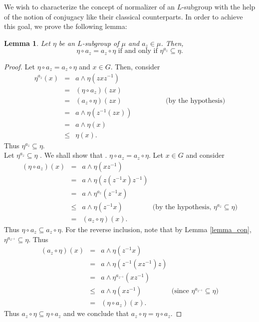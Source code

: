 \documentclass[10pt]{article}
\theoremstyle{plain}
\newtheorem{lemma}[theorem]{Lemma}
\theoremstyle{definition}
\theoremstyle{remark}
\theoremstyle{case}
\begin{document}
\noindent We wish to characterize the concept of normalizer of an $L$-subgroup with the help of the notion of conjugacy like their classical counterparts. In order to achieve this goal, we prove the following lemma:
\begin{lemma}
	Let $\eta$ be an $L$-subgroup of $\mu$ and $a_z \in \mu$. Then,
	\[
	\eta \circ a_z = a_z \circ \eta \text{~if and only if~} \eta^{a_z} \subseteq \eta.
	\]
\end{lemma}
\begin{proof}
	Let $\eta \circ a_z = a_z \circ \eta$ and $x\in G$. Then, consider
	\begin{eqnarray*}
		\eta^{a_z}(x) &=& a \wedge \eta (zxz^{-1})\\
		&=& (\eta \circ a_z)(zx)\\
		&=& (a_z \circ \eta)(zx)~\qquad\qquad\qquad \text{(by the hypothesis)}\\
		&=& a \wedge \eta (z^{-1}(zx))\\
		&=&a \wedge \eta(x)\\
		&\leq& \eta(x).
	\end{eqnarray*}
	Thus $\eta^{a_z} \subseteq \eta$. \\
	 Let $\eta^{a_z} \subseteq \eta$ . We shall show that . $\eta \circ {a_z} = a_z \circ \eta$. Let $x\in G$ and consider
	\begin{eqnarray*}
		(\eta \circ {a_z})(x) &=& a \wedge \eta (xz^{-1})\\
		&=& a \wedge \eta (z (z^{-1}x)z^{-1})\\
		&=& a \wedge \eta^{a_z}(z^{-1}x)\\
		&\leq& a \wedge \eta(z^{-1}x) \qquad\qquad ~\text{(by the hypothesis,~$\eta^{a_z} \subseteq \eta$)}\\
		&=& (a_z \circ \eta)(x).
	\end{eqnarray*}
	Thus $\eta \circ a_z \subseteq   a_z\circ \eta$. For the reverse inclusion, note that by Lemma \ref{lemma_con}, $\eta^{a_{z^{-1}}} \subseteq \eta$. Thus
	\begin{eqnarray*}
		(a_z \circ \eta)(x) &=& a \wedge \eta (z^{-1}x)\\
		&=& a \wedge \eta (z^{-1} (xz^{-1})z)\\
		&=& a \wedge \eta^{a_{z^{-1}}}(xz^{-1})\\
		&\leq& a \wedge \eta(xz^{-1}) \qquad\qquad ~\text{(since $\eta^{a_{z^{-1}}} \subseteq \eta$)}\\
		&=& (\eta \circ a_z)(x).
	\end{eqnarray*}
	Thus $a_z \circ \eta \subseteq \eta \circ a_z$ and we conclude that $a_z \circ \eta = \eta \circ a_z$.
\end{proof}
\end{document}
